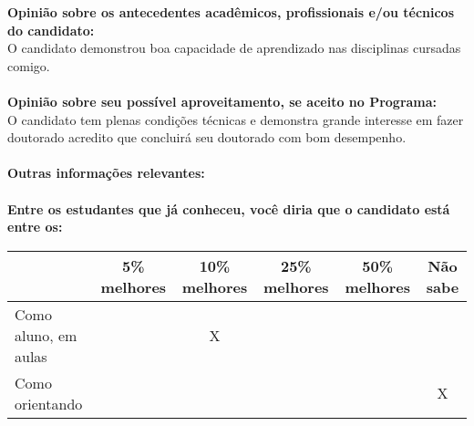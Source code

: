 \documentclass[11pt]{article}
\begin{document}
\textbf{Opinião sobre os antecedentes acadêmicos, profissionais e/ou técnicos do candidato:}
\\O candidato demonstrou boa capacidade de aprendizado nas disciplinas cursadas comigo.\\
\\
\textbf{Opinião sobre seu possível aproveitamento, se aceito no Programa:}
\\O candidato tem plenas condições técnicas e demonstra grande interesse em fazer doutorado acredito que concluirá seu doutorado com bom desempenho.\\ 
\\
\textbf{Outras informações relevantes:} \\
\\[0.3cm]
\textbf{Entre os estudantes que já conheceu, você diria que o candidato está entre os:}
\\
\begin{tabular}{|l|c|c|c|c|c|}
\hline
 & 5\% melhores & 10\% melhores & 25\% melhores & 50\% melhores & Não sabe \\
\hline
Como aluno, em aulas &  & X &  &  & \\
\hline
Como orientando &  &  &  &  & X\\
\hline
\end{tabular}
\end{document}
